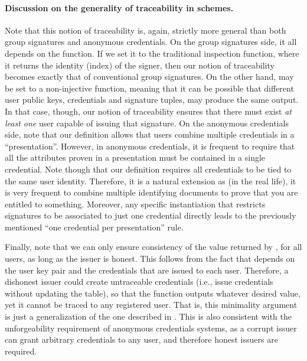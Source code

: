 \paragraph{Discussion on the generality of traceability in \UAS schemes.} %
Note that this notion of traceability is, again, strictly more general than
both group signatures and anonymous credentials. On the group signatures side,
it all depends on the \Inspect function. If we set it to the traditional
inspection function, where it returns the identity (index) of the signer, then
our notion of traceability becomes exactly that of conventional group
signatures. On the other hand, \Inspect may be set to a non-injective function,
meaning that it can be possible that different user public keys, credentials and
signature tuples, may produce the same output. In that case, though, our notion
of traceability ensures that there must exist \emph{at least one} user capable
of issuing that signature.
%
On the anonymous credentials side, note that our definition allows that users
combine multiple credentials in a ``presentation''. However, in anonymous
credentials, it is frequent to require that all the attributes proven in a
presentation must be contained in a single credential. Note though that our
definition requires all credentials to be tied to the same user identity.
Therefore, it is a natural extension as (in the real life), it is very frequent
to combine multiple identifying documents to prove that you are entitled to
something. Moreover, any specific instantiation that restricts signatures
to be associated to just one credential directly leads to the previously
mentioned ``one credential per presentation'' rule.

Finally, note that we can only ensure consistency of the value returned by
\finsp, for all users, as long as the issuer is honest. This follows from the
fact that \finsp depends on the user key pair and the credentials that are
issued to each user. Therefore, a dishonest issuer could create untraceable
credentials (i.e., issue credentials without updating the \trans table), so that
the \finsp function outputs whatever desired value, yet it cannot be traced to
any registered user. That is, this minimality argument is just a generalization
of the one described in \cite[Section 4.3]{bsz05}. This is also consistent with
the unforgeability requirement of anonymous credentials systems, as a corrupt
issuer can grant arbitrary credentials to any user, and therefore honest
issuers are required.

